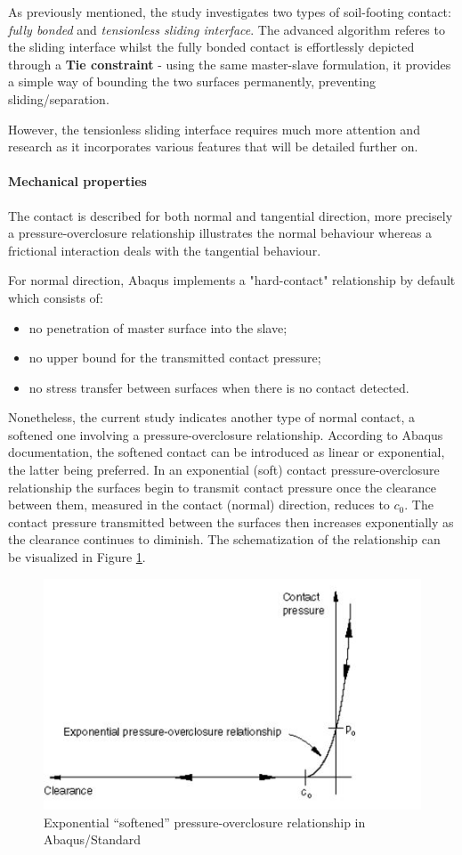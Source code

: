 As previously mentioned, the study investigates two types of soil-footing contact: \textit{fully bonded} and \textit{tensionless sliding interface}. The advanced algorithm referes to the sliding interface whilst the fully bonded contact is effortlessly depicted through a \textbf{Tie constraint} - using the same master-slave formulation, it provides a simple way of bounding the two surfaces permanently, preventing sliding/separation.

However, the tensionless sliding interface requires much more attention and research as it incorporates various features that will be detailed further on.
 
\paragraph{Mechanical properties}   
The contact is described for both normal and tangential direction, more precisely a pressure-overclosure relationship illustrates the normal behaviour whereas a frictional interaction deals with the tangential behaviour. 

For normal direction, Abaqus implements a "hard-contact" relationship by default which consists of:
\begin{itemize}
	\item no penetration of master surface into the slave;
	\item no upper bound for the transmitted contact pressure;
	\item no stress transfer between surfaces when there is no contact detected.
\end{itemize}

Nonetheless, the current study indicates another type of normal contact, a softened one involving a pressure-overclosure relationship. According to Abaqus documentation, the softened contact can be introduced as linear or exponential, the latter being preferred. In an exponential (soft) contact pressure-overclosure relationship the surfaces begin to transmit contact pressure once the clearance between them, measured in the contact (normal) direction, reduces to $c_0$. The contact pressure transmitted between the surfaces then increases exponentially as the clearance continues to diminish. The schematization of the relationship can be visualized in Figure \ref{pressure}.
\begin{figure}[!h]
	\centering
	\includegraphics[width=0.45 \linewidth]{"pressure"}
	\caption{Exponential “softened” pressure-overclosure relationship in Abaqus/Standard}
	\label{pressure}
\end{figure} 

